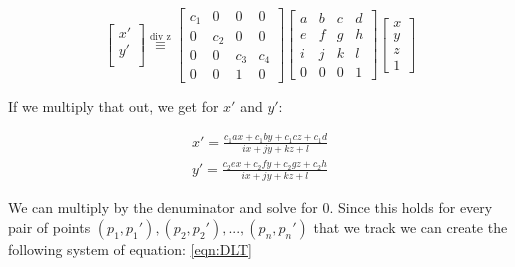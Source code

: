 \documentclass[conference]{IEEEtran}
\begin{document}
\begin{equation*}
    \begin{bmatrix}
        x' \\
        y' \\
    \end{bmatrix}
    \overset{\text{div z}}{\equiv}
    \begin{bmatrix}
        c_1 & 0   & 0   & 0   \\
        0   & c_2 & 0   & 0   \\
        0   & 0   & c_3 & c_4 \\
        0   & 0   & 1   & 0
    \end{bmatrix}
    \begin{bmatrix}
        a & b & c & d \\
        e & f & g & h \\
        i & j & k & l \\
        0 & 0 & 0 & 1
    \end{bmatrix}
    \begin{bmatrix}
        x \\
        y \\
        z \\
        1
    \end{bmatrix}
\end{equation*}

If we multiply that out, we get for $x'$ and $y'$:

\begin{gather*}
    x' = \frac{c_1 a x + c_1 b y + c_1 c z + c_1 d}{ix + jy + kz + l} \\
    y' = \frac{c_2 e x + c_2 f y + c_2 g z + c_2 h}{ix + jy + kz + l}
\end{gather*}

We can multiply by the denuminator and solve for 0. Since this holds for every pair of points $(p_{1} , p_{1}'), (p_{2} , p_{2}'), ..., (p_{n}, p_{n}')$ that we track we can create the following system of equation:
\ref{eqn:DLT}




\end{document}
